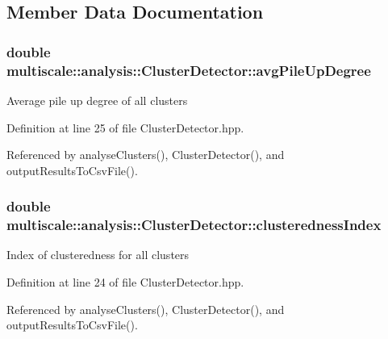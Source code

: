 \subsection{Member Data Documentation}
\hypertarget{classmultiscale_1_1analysis_1_1ClusterDetector_a6f6cfa50cf21ac400d41d6c6f2112bc9}{
\subsubsection[{avg\-Pile\-Up\-Degree}]{\setlength{\rightskip}{0pt plus 5cm}double multiscale\-::analysis\-::\-Cluster\-Detector\-::avg\-Pile\-Up\-Degree\hspace{0.3cm}{\ttfamily [protected]}}}\label{classmultiscale_1_1analysis_1_1ClusterDetector_a6f6cfa50cf21ac400d41d6c6f2112bc9}
Average pile up degree of all clusters 

Definition at line 25 of file Cluster\-Detector.\-hpp.



Referenced by analyse\-Clusters(), Cluster\-Detector(), and output\-Results\-To\-Csv\-File().

\hypertarget{classmultiscale_1_1analysis_1_1ClusterDetector_a5e2bf77041bd0d5047dd16c4632c16b7}{
\subsubsection[{clusteredness\-Index}]{\setlength{\rightskip}{0pt plus 5cm}double multiscale\-::analysis\-::\-Cluster\-Detector\-::clusteredness\-Index\hspace{0.3cm}{\ttfamily [protected]}}}\label{classmultiscale_1_1analysis_1_1ClusterDetector_a5e2bf77041bd0d5047dd16c4632c16b7}
Index of clusteredness for all clusters 

Definition at line 24 of file Cluster\-Detector.\-hpp.



Referenced by analyse\-Clusters(), Cluster\-Detector(), and output\-Results\-To\-Csv\-File().

